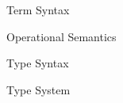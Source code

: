 \documentclass{article}
\begin{document}
\begin{figure}[]
  \centering
  
  \caption{\EEFF Term Syntax}
\end{figure}

\begin{figure}[]
  \centering
  
  \caption{\EEFF Operational Semantics}
\end{figure}

\begin{figure}[]
  \centering
  
  \caption{\EEFF Type Syntax}
\end{figure}

\begin{figure}[]
  \centering
  
  \caption{\EEFF Type System}
\end{figure}
\end{document}
